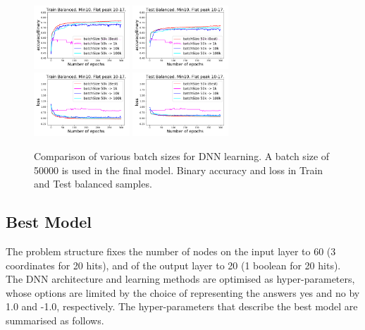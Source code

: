 \begin{figure}[!htb]
\centering
\includegraphics[width=0.32\textwidth]{plots/plot_01_1_overlay_graph_accuracyBinary_Train_BatchSize.pdf}
\includegraphics[width=0.32\textwidth]{plots/plot_01_1_overlay_graph_accuracyBinary_Test_BatchSize.pdf}\\
\includegraphics[width=0.32\textwidth]{plots/plot_01_1_overlay_graph_loss_Train_BatchSize.pdf}
\includegraphics[width=0.32\textwidth]{plots/plot_01_1_overlay_graph_loss_Test_BatchSize.pdf}\\
\caption{Comparison of various batch sizes for DNN learning. A batch size of 50000 is used in the final model. Binary accuracy and loss in Train and Test balanced samples.}
\label{fig:HPBatchSize}
\end{figure}

\subsection{Best Model}
\label{sec:BestModel}

The problem structure fixes the number of nodes on the input layer to 60 (3 coordinates for 20 hits), and of the output layer to 20 (1 boolean for 20 hits). The DNN architecture and learning methods are optimised as hyper-parameters, whose options are limited by the choice of representing the answers yes and no by 1.0 and -1.0, respectively. The hyper-parameters that describe the best model are summarised as follows.

